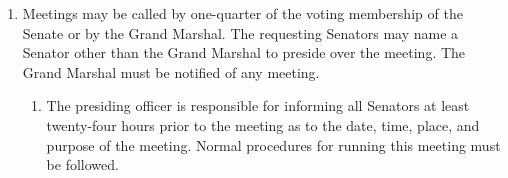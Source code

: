 \documentclass{uniondoc}
\begin{document}
\begin{enumerate}
	\item Meetings may be called by one-quarter of the voting membership of the Senate or by the Grand Marshal.
	      The requesting Senators may name a Senator other than the Grand Marshal to preside over the meeting.
	      The Grand Marshal must be notified of any meeting.
	      \begin{enumerate}
		      \item The presiding officer is responsible for informing all Senators at least twenty-four hours prior to the meeting as to the date, time, place, and purpose of the meeting.
		            Normal procedures for running this meeting must be followed.
	      \end{enumerate}
\end{enumerate}

\end{document}
